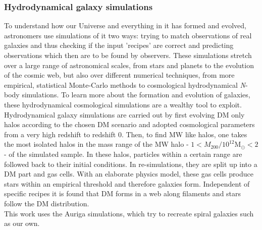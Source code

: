 \subsubsection{Hydrodynamical galaxy simulations}\label{subsubsec:hydro_sim}
To understand how our Universe and everything in it has formed and evolved, astronomers use simulations of it two ways: trying to match observations of real galaxies and thus checking if the input 'recipes' are correct and predicting observations which then are to be found by observers. These simulations stretch over a large range of astronomical scales, from stars and planets to the evolution of the cosmic web, but also over different numerical techniques, from more empirical, statistical Monte-Carlo methods to cosmological hydrodynamical \textit{N}-body simulations. To learn more about the formation and evolution of galaxies, these hydrodynamical cosmological simulations are a wealthy tool to exploit. 
\\Hydrodynamical galaxy simulations are carried out by first evolving \ac{DM} only halos according to the chosen \ac{DM} scenario and adopted cosmological parameters from a very high redshift to redshift 0. Then, to find \ac{MW} like halos, one takes the most isolated halos in the mass range of the \ac{MW} halo - $1 < M_{200} / 10^{12} \mathrm{M}_\odot < 2$ - of the simulated sample. In these halos, particles within a certain range are followed back to their initial conditions. In re-simulations, they are split up into a \ac{DM} part and gas cells. With an elaborate physics model, these gas cells produce stars within an empirical threshold and therefore galaxies form. Independent of specific recipes it is found that \ac{DM} forms in a web along filaments and stars follow the \ac{DM} distribution. 
\\This work uses the Auriga \citep{AurigaGrand} simulations, which try to recreate spiral galaxies such as our own. 
